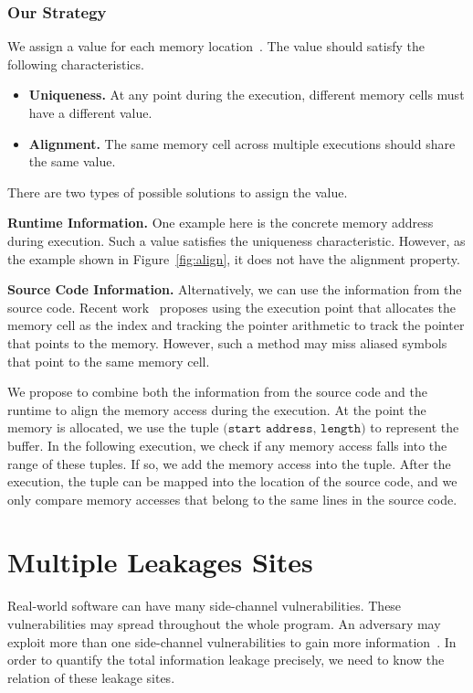 \subsubsection*{Our Strategy} We assign a value for each memory location~\cite{sumner2010memory}. The value should satisfy the following characteristics.
\begin{itemize}
  \item \textbf{Uniqueness.} At any point during the execution, different memory cells must have a different value.
  \item \textbf{Alignment.} The same memory cell across multiple executions should share the same value.
\end{itemize}

There are two types of possible solutions to assign the value.

\textbf{Runtime Information.} One example here is the concrete memory address during execution. Such a value satisfies the uniqueness characteristic. However, as the example shown in Figure~\ref{fig:align}, it does not have the alignment property.

\textbf{Source Code Information.} Alternatively, we can use the information from the source code. Recent work~\cite{sumner2010memory} proposes using the execution point that allocates the memory cell as the index and tracking the pointer arithmetic to track the pointer that points to the memory. However, such a method may miss aliased symbols that point to the same memory cell.

We propose to combine both the information from the source code and the runtime to align the memory access during the execution. At the point the memory is allocated, we use the tuple $\texttt{(start\ address, length)}$ to represent the buffer. In the following execution, we check if any memory access falls into the range of these tuples. If so, we add the memory access into the tuple. After the execution, the tuple can be mapped into the location of the source code, and we only compare memory accesses that belong to the same lines in the source code.

\section{Multiple Leakages Sites}
Real-world software can have many side-channel vulnerabilities. These vulnerabilities may spread throughout the whole program. An adversary may exploit more than one side-channel vulnerabilities to gain more information~\cite{7163052, 191010}. In order to quantify the
total information leakage precisely, we need to know the relation of these leakage sites. 

